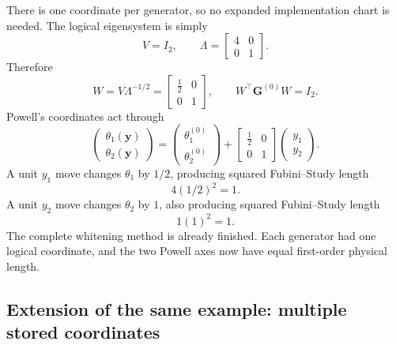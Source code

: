 \documentclass[11pt]{article}
\begin{document}
There is one coordinate per generator, so no expanded implementation chart is
needed.  The logical eigensystem is simply
\begin{equation}
V=I_2,
\qquad
\Lambda
=
\begin{bmatrix}
4&0\\
0&1
\end{bmatrix}.
\label{eq:example-logical-eigensystem}
\end{equation}
Therefore
\begin{equation}
W
=
V\Lambda^{-1/2}
=
\begin{bmatrix}
\tfrac12&0\\
0&1
\end{bmatrix},
\qquad
W^\top\mathbf G^{(0)}W=I_2.
\label{eq:example-logical-W}
\end{equation}
Powell's coordinates act through
\begin{equation}
\begin{pmatrix}
\theta_1(\mathbf y)\\
\theta_2(\mathbf y)
\end{pmatrix}
=
\begin{pmatrix}
\theta_1^{(0)}\\
\theta_2^{(0)}
\end{pmatrix}
+
\begin{bmatrix}
\tfrac12&0\\
0&1
\end{bmatrix}
\begin{pmatrix}y_1\\y_2\end{pmatrix}.
\label{eq:example-powell-chart}
\end{equation}
A unit \(y_1\) move changes \(\theta_1\) by \(1/2\), producing squared
Fubini--Study length
\[
4(1/2)^2=1.
\]
A unit \(y_2\) move changes \(\theta_2\) by \(1\), also producing squared
Fubini--Study length
\[
1(1)^2=1.
\]
The complete whitening method is already finished.  Each generator had one
logical coordinate, and the two Powell axes now have equal first-order
physical length.

\subsection*{Extension of the same example: multiple stored coordinates}
\end{document}
